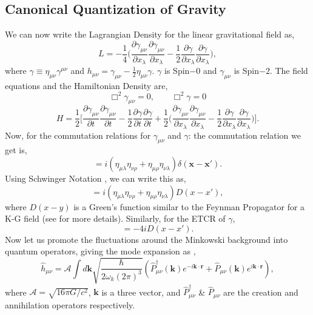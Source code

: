 \documentclass[11pt]{article}
\newcommand{\mink}{\eta_{\mu\nu}}
\newcommand{\munu}{\mu\nu}
\begin{document}
\subsection{Canonical Quantization of Gravity}
We can now write the Lagrangian Density for the linear gravitational field as,
\begin{equation}
    L = -\frac{1}{4}\Bigg(\frac{\partial\gamma_{\munu}}{\partial x_{\lambda}}\frac{\partial\gamma_{\munu}}{\partial x_{\lambda}} - \frac{1}{2}\frac{\partial\gamma}{\partial x_{\lambda}}\frac{\partial\gamma}{\partial x_{\lambda}}\Bigg),
\end{equation}
where $\gamma \equiv \mink \gamma^{\munu}$ and $h_{\munu} = \gamma_{\munu} - \frac{1}{2}\mink\gamma$. $\gamma$ is Spin$-0$ and $\gamma_{\munu}$ is Spin$-2$. The field equations and the Hamiltonian Density are,
\begin{equation}
    \Box^2\gamma_{\munu} = 0,\qquad \Box^2\gamma = 0
\end{equation}
\begin{equation}
    H = \frac{1}{2}\Bigg[\frac{\partial\gamma_{\munu}}{\partial t}\frac{\partial\gamma_{\munu}}{\partial t} - \frac{1}{2}\frac{\partial\gamma}{\partial t}\frac{\partial\gamma}{\partial t} + \frac{1}{2}\Bigg(\frac{\partial\gamma_{\munu}}{\partial x_{\lambda}}\frac{\partial\gamma_{\munu}}{\partial x_{\lambda}} - \frac{1}{2}\frac{\partial\gamma}{\partial x_{\lambda}}\frac{\partial\gamma}{\partial x_{\lambda}}\Bigg)\Bigg].
    \label{eq: HamiltonianDensity}
\end{equation}
Now, for the commutation relations for $\gamma_{\munu}$ and $\gamma$: the commutation relation we get is,
\begin{equation}
    [\gamma_{\munu}(x), \dot{\gamma}_{\lambda\rho}(x')] = i(\eta_{\mu\lambda}\eta_{\nu\rho} + \eta_{\mu\rho}\eta_{\nu\lambda})\delta(\bm{x}-\bm{x'}).
\end{equation}
Using Schwinger Notation \cite{Gupta_1952, PhysRev.74.1439}, we can write this as,
\begin{equation}
    [\gamma_{\munu}(x), \gamma_{\lambda\rho}(x')] = i(\eta_{\mu\lambda}\eta_{\nu\rho} + \eta_{\mu\rho}\eta_{\nu\lambda})D(x-x'),
\end{equation}
where $D(x-y)$ is a Green's function similar to the Feynman Propagator for a K-G field (see \citet[§2.4, Eq. 2.59]{Peskin} for more details).
Similarly, for the ETCR of $\gamma$,
\begin{equation}
    [\gamma(x), \gamma(x')] = -4iD(x-x').
\end{equation}
Now let us promote the fluctuations around the Minkowski background into quantum operators, giving the mode expansion as \cite{Bose_2022},
\begin{equation}
    \hat{h}_{\munu} = \mathcal{A}\int d\bm{k} \sqrt{\frac{\hbar}{2\omega_k(2\pi)^3}}(\hat{P}_{\munu}^{\dagger}(\bm{k})e^{-i\bm{k}\cdot\bm{r}} + \hat{P}_{\munu}(\bm{k})e^{i\bm{k}\cdot\bm{r}}),
\end{equation}
where $\mathcal{A} = \sqrt{16\pi G/c^2}$, $\bm{k}$ is a three vector, and $\hat{P}_{\munu}^{\dagger}$ \& $\hat{P}_{\munu}$ are the creation and annihilation operators respectively.
\end{document}
